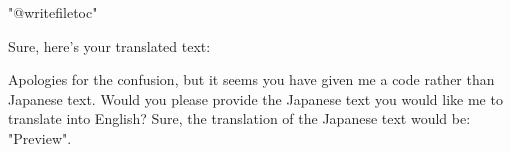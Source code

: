 "@writefile{toc}{\protected@file@percent}"

Sure, here's your translated text:

Apologies for the confusion, but it seems you have given me a code rather than Japanese text. Would you please provide the Japanese text you would like me to translate into English?
Sure, the translation of the Japanese text would be: "Preview".
